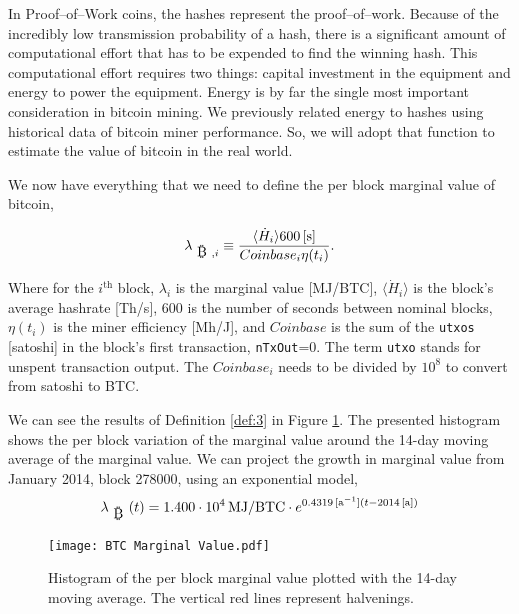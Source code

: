 \documentclass[runningheads]{llncs}
\def\bitcoin{
    \leavevmode
    \vtop{\offinterlineskip %
    \setbox0=\hbox{B}
    \setbox2=\hbox to\wd0{\hfil\hskip-.03em
    \vrule height .3ex width .15ex\hskip .08em
    \vrule height .3ex width .15ex\hfil}
    \vbox{\copy2\box0}\box2}
}
\begin{document}
In Proof--of--Work coins, the hashes represent the proof--of--work.
Because of the incredibly low transmission probability of a hash, there is a significant amount of computational effort that has to be expended to find the winning hash.
This computational effort requires two things: capital investment in the equipment and energy to power the equipment.
Energy is by far the single most important consideration in bitcoin mining.
We previously related energy to hashes using historical data of bitcoin miner performance.
So, we will adopt that function to estimate the value of bitcoin in the real world.

We now have everything that we need to define the per block marginal value of bitcoin,
\begin{definition}\label{def:3}
    \begin{equation}
        \lambda_{\mbox{\bitcoin},i} \equiv \frac{\langle \dot{H}_i \rangle  600\,[\mathrm{s}]}{Coinbase_i \eta(t_i)}.\label{eq:9}
    \end{equation}
\end{definition}
Where for the $i^{\mbox{th}}$ block, $\lambda_i$ is the marginal value [MJ/BTC], $\langle \dot{H}_i \rangle$ is the block's average hashrate [Th/s], 600 is the number of seconds between nominal blocks, $\eta(t_i)$ is the miner efficiency [Mh/J], and $Coinbase$ is the sum of the {\tt utxos} [satoshi] in the block's first transaction, {\tt nTxOut}=0.
The term {\tt utxo} stands for unspent transaction output. The $Coinbase_i$ needs to be divided by $10^8$ to convert from satoshi to BTC.

We can see the results of Definition \ref{def:3} in Figure \ref{fig:5}.
The presented histogram shows the per block variation of the marginal value around the 14-day moving average of the marginal value.
We can project the growth in marginal value from January 2014, block 278000, using an exponential model,
\begin{equation}
    \lambda_{\mbox{\bitcoin}}(t) = 1.400\cdot 10^4 \, \textrm{MJ/BTC} \cdot e^{0.4319 \,[\textrm{a}^{-1}] (t - 2014\,[\textrm{a}])}\label{eq:15}
\end{equation}

\begin{figure}
    \texttt{[image: BTC Marginal Value.pdf]}
    \caption{Histogram of the per block marginal value plotted with the 14-day moving average. The vertical red lines represent halvenings.} \label{fig:5}
\end{figure}
\end{document}
